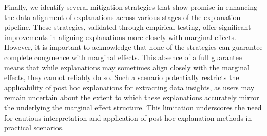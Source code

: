 \documentclass[12pt]{article}  %
\begin{document}
        
         Finally, we identify several mitigation strategies that show promise in enhancing the data-alignment of explanations across various stages of the explanation pipeline. These strategies, validated through empirical testing, offer significant improvements in aligning explanations more closely with marginal effects. However, it is important to acknowledge that none of the strategies can guarantee complete congruence with marginal effects. This absence of a full guarantee means that while explanations may sometimes align closely with the marginal effects, they cannot reliably do so. Such a scenario potentially restricts the applicability of post hoc explanations for extracting data insights, as users may remain uncertain about the extent to which these explanations accurately mirror the underlying the marginal effect structure. This limitation underscores the need for cautious interpretation and application of post hoc explanation methods in practical scenarios.
        
        

            



        
\end{document}

